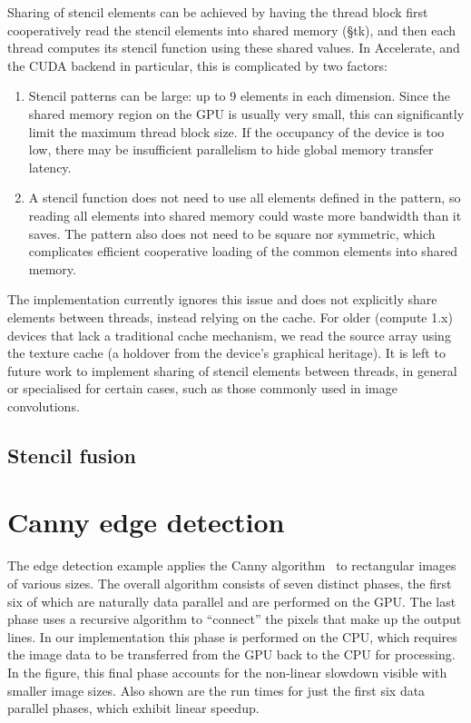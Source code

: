 Sharing of stencil elements can be achieved by having the thread block first
cooperatively read the stencil elements into shared memory (\S tk), and then
each thread computes its stencil function using these shared values. In
Accelerate, and the CUDA backend in particular, this is complicated by two
factors:
%
\begin{enumerate}
    \item Stencil patterns can be large: up to 9 elements in each dimension.
        Since the shared memory region on the GPU is usually very small, this
        can significantly limit the maximum thread block size. If the occupancy
        of the device is too low, there may be insufficient parallelism to hide
        global memory transfer latency.

    \item A stencil function does not need to use all elements defined in the
        pattern, so reading all elements into shared memory could waste more
        bandwidth than it saves. The pattern also does not need to be square nor
        symmetric, which complicates efficient cooperative loading of the
        common elements into shared memory.
\end{enumerate}

The implementation currently ignores this issue and does not explicitly share
elements between threads, instead relying on the cache. For older (compute 1.x)
devices that lack a traditional cache mechanism, we read the source array using
the texture cache (a holdover from the device's graphical heritage). It is left
to future work to implement sharing of stencil elements between threads, in
general or specialised for certain cases, such as those commonly used in image
convolutions.

\subsection{Stencil fusion}



\section{Canny edge detection}
\label{sec:canny}

The edge detection example applies the Canny algorithm~\cite{Canny:1986et} to
rectangular images of various sizes. The overall algorithm consists of seven
distinct phases, the first six of which are naturally data parallel and are
performed on the GPU. The last phase uses a recursive algorithm to ``connect''
the pixels that make up the output lines. In our implementation this phase is
performed on the CPU, which requires the image data to be transferred from the
GPU back to the CPU for processing. In the figure, this final phase accounts for
the non-linear slowdown visible with smaller image sizes. Also shown are the run
times for just the first six data parallel phases, which exhibit linear speedup.

